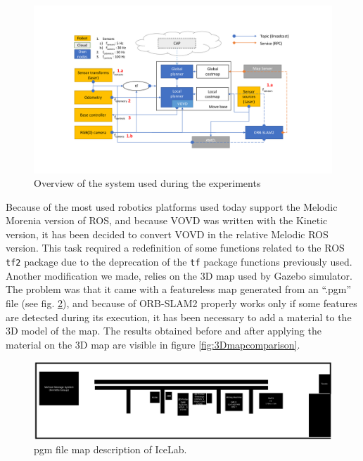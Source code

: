 \begin{figure}[htbp]
	\centering
	\includegraphics[width=\textwidth]{images/sysoverview}
	\caption{Overview of the system used during the experiments}
	\label{fig:sysoverview}
\end{figure}

Because of the most used robotics platforms used today support the Melodic Morenia \cite{rosmelodic} version of ROS, and because VOVD was written with the Kinetic version, it has been decided to convert VOVD in the relative Melodic ROS version. This task required a redefinition of some functions related to the ROS \texttt{tf2} package \cite{tfros} due to the deprecation of the \texttt{tf} package functions previously used. 
Another modification we made, relies on the 3D map used by Gazebo \cite{Gazebo} simulator. The problem was that it came with a featureless map generated from an ``.pgm'' file (see fig. \ref{fig:mapfile}), and because of ORB-SLAM2 properly works only if some features are detected during its execution, it has been necessary to add a material to the 3D model of the map. The results obtained before and after applying the material on the 3D map are visible in figure \ref{fig:3Dmapcomparison}.

\begin{figure}[htbp]
	\centering
	\includegraphics[width=\textwidth]{images/icelabmap}
	\caption{pgm file map description of IceLab.}
	\label{fig:mapfile}
\end{figure}

